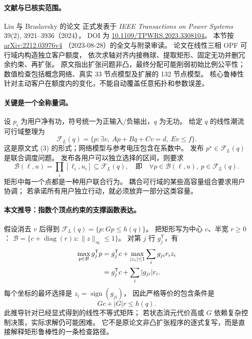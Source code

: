 \documentclass[UTF8,11pt,fontset=fandol]{ctexart}
\theoremstyle{remark}
\numberwithin{equation}{section}
\begin{document}
\paragraph{文献与已核实范围。}
Liu 与 Braslavsky 的论文 \citep{S11} 正式发表于
\emph{IEEE Transactions on Power Systems} 39(2), 3921--3936（2024），
DOI 为 \href{https://doi.org/10.1109/TPWRS.2023.3308104}{10.1109/TPWRS.2023.3308104}。
本节按 \href{https://arxiv.org/html/2212.03976v4}{arXiv:2212.03976v4}
（2023-08-28）的全文与附录审读。
论文在线性三相 OPF 可行域内构造独立客户额度，
依次求轴对齐内接椭球、提取矩形、固定无功并删冗余约束、再扩张。
原文指出扩张问题非凸，最终分配可能削弱初始比例公平性；
数值检查包括概念网络、真实 33 节点模型及扩展的 132 节点模型。
核心鲁棒性针对主动客户在额度内的变化，不能自动覆盖任意拓扑和参数误差。

\paragraph{关键是一个全称量词。}
设 $p_i$ 为用户净有功，符号统一为正输入/负输出，$q$ 为无功。
给定 $q$ 的线性潮流可行域整理为
\begin{equation}
 \mathcal F_L(q)=\{p:\exists v,\ Ap+Bq+Cv=d,\ Ev\leq f\}.
 \label{eq:eng-s11-FL}
\end{equation}
这是原文式 (3) 的形式；网络模型与参考电压包含在系数中。
发布 $p^\star\in\mathcal F_L(q)$ 是联合调度问题。
发布各用户可以独立选择的区间，则要求
\begin{equation}
 \mathcal B(\ell,u)=\prod_i[\ell_i,u_i]\subseteq\mathcal F_L(q),
 \quad\text{即}\quad
 \forall p\in\mathcal B(\ell,u),\ p\in\mathcal F_L(q).
 \label{eq:eng-s11-box}
\end{equation}
矩形中每一个点都是一种用户联合行为。
耦合可行域的某些高容量组合要求用户协调；
若承诺所有用户独立行动，就必须放弃一部分这类容量。

\paragraph{本文推导：指数个顶点约束的支撑函数表达。}
假设消去 $v$ 后得到 $\mathcal F_L(q)=\{p:Gp\leq h(q)\}$。
把矩形写为中心 $c$、半宽 $r\geq0$：
$\mathcal B=\{c+\operatorname{diag}(r)z:\|z\|_\infty\leq1\}$。
对第 $j$ 行 $g_j^{\mathsf T}$，有
\begin{align}
 \max_{p\in\mathcal B}g_j^{\mathsf T}p
 &=g_j^{\mathsf T}c+
   \max_{|z_i|\leq1}\sum_i g_{ji}r_i z_i\notag\\
 &=g_j^{\mathsf T}c+\sum_i|g_{ji}|r_i.
 \label{eq:eng-s11-support-box}
\end{align}
每个坐标的最坏选择是 $z_i=\operatorname{sign}(g_{ji})$，
因此严格等价的包含条件是
\begin{equation}
 Gc+|G|r\leq h(q).
 \label{eq:eng-s11-box-cert}
\end{equation}
此推导针对已经显式得到的线性不等式矩阵；
若状态消元代价高或 $G$ 依赖复杂控制决策，实际求解仍可能困难。
它不是原论文非凸扩张程序的逐式复写，而是直接解释矩形鲁棒性的一条检查路径。
\end{document}
